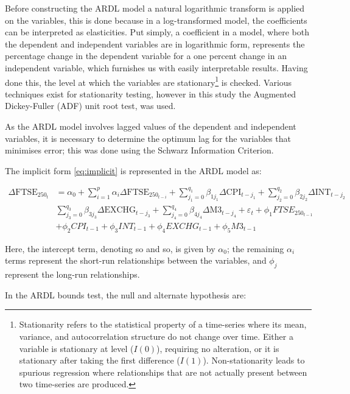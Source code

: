 \documentclass[11pt,a4paper]{article}
\begin{document}
Before constructing the ARDL model a natural logarithmic transform is applied
on the variables, this is done because in a log-transformed model,
the coefficients can be interpreted as elasticities. Put simply, 
a coefficient in a model, where both the dependent and independent variables
are in logarithmic form, represents the percentage change in the 
dependent variable for a one percent change in an independent variable, 
which furnishes us with easily interpretable results. Having done this,
the level at which the variables are stationary\footnote{Stationarity refers to the statistical property of a time-series where 
its mean, variance, and autocorrelation structure do not change over time. Either a variable is stationary at level ($I(0)$), requiring no alteration,
or it is stationary after taking the first difference ($I(1)$). 
Non-stationarity leads to spurious regression where relationships that 
are not actually present between two time-series are produced.} is checked.
Various techniques exist for stationarity testing, however in this study the 
Augmented Dickey-Fuller (ADF) unit root test, was used. 

As the ARDL model involves lagged values of the dependent and independent 
variables, it is necessary to determine the optimum lag for the variables 
that minimises error; this was done using the Schwarz
Information Criterion.

The implicit form \eqref{eq:implicit} is represented in the ARDL model as:

\begin{align*}
    \Delta \text{FTSE}_{250_t} &= \alpha_0 + \sum_{i=1}^{p} \alpha_i \Delta \text{FTSE}_{250_{t-i}} + \sum_{j_{1}=0}^{q_1} \beta_{1j_{1}} \Delta \text{CPI}_{t-j_{1}} + \sum_{j_{2}=0}^{q_2} \beta_{2j_{2}} \Delta \text{INT}_{t-j_{2}} \\
                               & \sum_{j_{3}=0}^{q_3} \beta_{3j_{3}} \Delta \text{EXCHG}_{t-j_{3}} + \sum_{j_{4}=0}^{q_4} \beta_{4j_{4}} \Delta \text{M3}_{t-j_{4}} + \varepsilon_t + \phi_{1} FTSE_{250_{t-1}} \\
                               & + \phi_{2} CPI_{t-1} + \phi_{3} INT_{t-1} +\phi_4 EXCHG_{t-1} + \phi_5 M3_{t-1}
\end{align*}

Here, the intercept term, denoting so and so, is given by $\alpha_0$; the 
remaining $\alpha_i$ terms represent the short-run relationships 
between the variables, and $\phi_j$ represent the long-run relationships. 

In the ARDL bounds test, the null and alternate hypothesis are:
 
\end{document}
